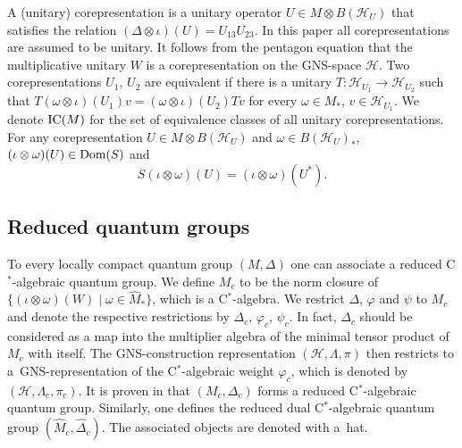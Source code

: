 \documentclass[pdftex]{sigma}
\numberwithin{equation}{section}
\theoremstyle{definition}
\newcommand{\cHil}{\mathcal{H}}
\newcommand{\ICM}{\text{\rm IC}(M)}
\newcommand{\Dom}{\text{\rm Dom}}
\begin{document}
A (unitary) corepresentation is a unitary operator $U \in M \otimes B(\cHil_U)$ that satisf\/ies the relation $(\Delta \otimes \iota) (U) = U_{13}U_{23}$. In this paper all corepresentations are assumed to be unitary. It follows from the pentagon equation that the multiplicative unitary $W$ is a corepresentation on the GNS-space $\cHil$. Two corepresentations $U_1$, $U_2$ are equivalent if there is a unitary $T: \cHil_{U_1} \rightarrow \cHil_{U_2}$ such that $T (\omega \otimes \iota)(U_1) v = (\omega \otimes \iota)(U_2) T v$ for every $\omega \in M_\ast$, $v \in \cHil_{U_1}$. We denote $\ICM$ for the set of equivalence classes of all unitary corepresentations. For any corepresentation $U \in M \otimes B(\cHil_U)$ and $\omega \in B(\cHil_U)_\ast$, $(\iota \otimes \omega)(U) \in \Dom(S)$ and
\[
S (\iota \otimes \omega)(U) = (\iota \otimes \omega)(U^\ast) .
\]

\subsection*{Reduced quantum groups}
To every locally compact quantum group $(M, \Delta)$ one can associate a reduced C$^\ast$-algebraic quantum group. We def\/ine $M_c$ to be the norm closure of $\{ (\iota \otimes \omega)(W) \mid \omega \in \hat{M}_\ast \}$, which is a C$^\ast$-algebra. We restrict $\Delta$, $\varphi$ and $\psi$ to $M_c$ and denote the respective restrictions by $\Delta_c$, $\varphi_c$, $\psi_c$. In fact, $\Delta_c$ should be considered as a map into the multiplier algebra of the minimal tensor product of $M_c$ with itself. The GNS-construction representation $(\cHil, \Lambda, \pi)$ then restricts to a~GNS-representation of the C$^\ast$-algebraic weight $\varphi_c$, which is denoted by $(\cHil, \Lambda_c, \pi_c)$.
It is proven in \cite{KusVae} that $(M_c, \Delta_c)$ forms a reduced C$^\ast$-algebraic quantum group.
Similarly, one def\/ines the reduced dual  C$^\ast$-algebraic quantum group $(\hat{M}_c, \hat{\Delta}_c)$. The associated objects are denoted with a~hat.
\end{document}
